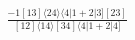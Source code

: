 \documentclass[varwidth, border=5pt]{standalone}
\begin{document}
\begin{my}
$\begin{gathered}
\scriptscriptstyle\frac{-1[13]⟨24⟩⟨4|1+2|3][23]}{[12]⟨14⟩[34]⟨4|1+2|4]}
\end{gathered}$
\end{my}
\end{document}
